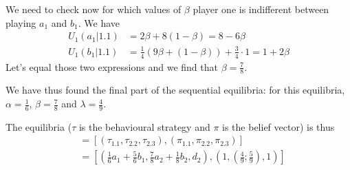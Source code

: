 \begin{itemize}
    We need to check now for which values of $\beta$ player one is indifferent between playing $a_1$ and $b_1$. We have 
    \begin{align*}
        U_1(a_1|1.1)&= 2\beta + 8 (1-\beta) = 8 - 6 \beta\\
        U_1(b_1|1.1)&=\frac{1}{4} (9\beta + (1-\beta) ) + \frac{3}{4} \cdot 1 = 1 + 2\beta
    \end{align*} 
    Let's equal those two expressions and we find that $\beta = \frac{7}{8}$. 
    
    We have thus found the final part of the sequential equilibria: for this equilibria, $\alpha=\frac{1}{6}$, $\beta =\frac{7}{8}$ and $\lambda = \frac{4}{9}$.
    \end{itemize}
    The equilibria  ($\tau$ is the behavioural strategy and $\pi$ is the belief vector) is thus \begin{align*}
        [\tau, \pi ]&= \left[ \left(\tau_{1.1},\tau_{2.2},\tau_{2.3} \right), \left(\pi_{1.1}, \pi_{2.2} , \pi_{2.3}\right) \right]\\
        &=\left[ \left(\frac{1}{6} a_1 + \frac{5}{6} b_1, \frac{7}{8} a_2 +\frac{1}{8} b_2, d_2\right) , \left( 1, (\frac{4}{9};\frac{5}{9}),1\right)\right]
    \end{align*} 
